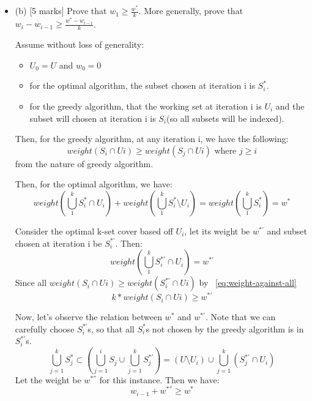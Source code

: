 \documentclass[12pt]{article}
\begin{document}
\begin{enumerate}
\begin{itemize}
\item{(b)} [5 marks]
Prove that $w_{1} \geq \frac{w^{*}}{k}$. More generally, prove that $w_{i}-w_{i-1} \geq \frac{w^{*}-w_{i-1}}{k}$.


Assume without loss of generality:

\begin{itemize}
\item $U_{0}=U$ and $w_{0} = 0$
\item for the optimal algorithm, the subset chosen at iteration i is $S_{i}^{*}$.
\item for the greedy algorithm, that the working set at iteration i is $U_{i}$ and the subset will chosen at iteration i is $S_{i}$(so all subsets will be indexed).
\end{itemize}

Then, for the greedy algorithm, at any iteration i, we have the following:
\begin{equation} \label{eq:weight-against-all}
weight(S_{i} \cap U{i}) \geq weight(S_{j} \cap U{i}) \text{ where } j \geq i
\end{equation}
from the nature of greedy algorithm.

Then, for the optimal algorithm, we have:
\begin{equation} \label{eq:optimal-weight-divide}
weight(\bigcup_{1}^{k}S_{i}^{*} \cap U_{i}) + weight(\bigcup_{1}^{k}S_{i}^{*} \setminus U_{i}) = weight(\bigcup_{1}^{k}S_{i}^{*}) = w^{*}
\end{equation}

Consider the optimal k-set cover based off $U_{i}$, let its weight be $w^{*'}$ and subset chosen at iteration i be $S_{i}^{*'}$. Then:
\begin{equation}
weight(\bigcup_{1}^{k}S_{i}^{*'} \cap U_{i}) = w^{*'}
\end{equation}
Since all $weight(S_{i} \cap U{i}) \geq weight(S_{i}^{*'} \cap U{i})$ by ~\ref{eq:weight-against-all}
\begin{equation} \label{eq:optimal-sum}
k * weight(S_{i} \cap U{i}) \geq w^{*'}
\end{equation}

Now, let's observe the relation between $w^{*}$ and $w^{*'}$. Note that we can carefully choose $S_{i}^{*'}$s, so that all $S_{i}^{*}$s not chosen by the greedy algorithm is in $S_{i}^{*'}$s.
\begin{equation}
\bigcup_{j=1}^{k}S_{j}^{*} \subset (\bigcup_{j=1}^{i}S_{j} \cup \bigcup_{j=1}^{k}S_{j}^{*'}) = (U \setminus U_{i}) \cup \bigcup_{j=1}^{k}(S_{j}^{*'} \cap U_{i})
\end{equation}
Let the weight be  $w^{*''}$ for this instance. Then we have:
\begin{equation} \label{eq:optimal-against-optimal}
w_{i-1} + w^{*''} \geq w^{*}
\end{equation}


\end{itemize}
\end{enumerate}
\end{document}

